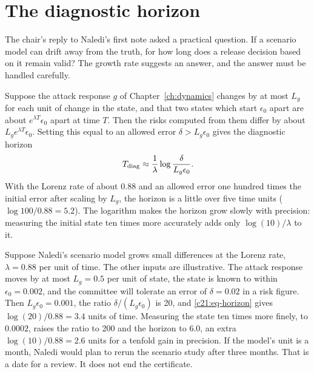 \section{The diagnostic horizon}

The chair's reply to Naledi's first note asked a practical question. If a scenario model can
drift away from the truth, for how long does a release decision based on it remain valid? The
growth rate suggests an answer, and the answer must be handled carefully.

Suppose the attack response $g$ of Chapter~\ref{ch:dynamics} changes by at most $L_g$ for each unit of
change in the state, and that two states which start $\epsilon_0$ apart are about $e^{\lambda T}\epsilon_0$ apart at
time $T$. Then the risks computed from them differ by about $L_ge^{\lambda T}\epsilon_0$. Setting this equal to an
allowed error $\delta>L_g\epsilon_0$ gives the diagnostic horizon
\begin{equation}\label{c21:eq-horizon}
T_{\rm diag}\approx\frac1\lambda\log\frac{\delta}{L_g\epsilon_0}.
\end{equation}
With the Lorenz rate of about $0.88$ and an allowed error one hundred times the initial error after
scaling by $L_g$, the horizon is a little over five time units ($\log100/0.88=5.2$). The logarithm
makes the horizon grow slowly with precision: measuring the initial state ten times more accurately
adds only $\log(10)/\lambda$ to it.

\begin{example}\label{c21:ex-horizon}
Suppose Naledi's scenario model grows small differences at the Lorenz rate, $\lambda=0.88$ per unit of
time. The other inputs are illustrative. The attack response moves by at most $L_g=0.5$ per unit of
state, the state is known to within $\epsilon_0=0.002$, and the committee will tolerate an error of
$\delta=0.02$ in a risk figure. Then $L_g\epsilon_0=0.001$, the ratio $\delta/(L_g\epsilon_0)$ is 20, and \eqref{c21:eq-horizon} gives
$\log(20)/0.88=3.4$ units of time. Measuring the state ten times more finely, to $0.0002$, raises the
ratio to 200 and the horizon to $6.0$, an extra $\log(10)/0.88=2.6$ units for a tenfold gain in
precision. If the model's unit is a month, Naledi would plan to rerun the scenario study after three
months. That is a date for a review. It does not end the certificate.
\end{example}

